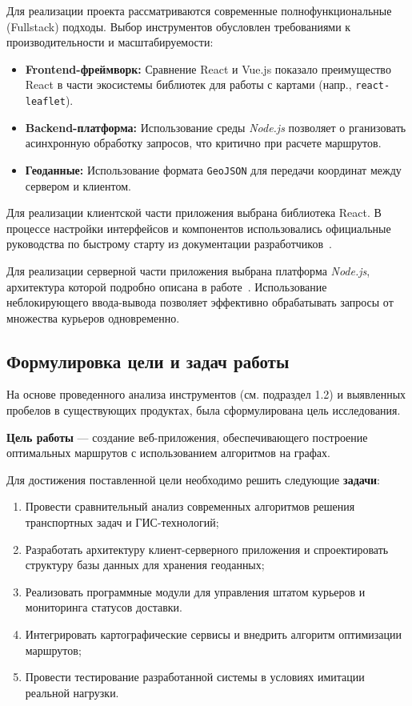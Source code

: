 Для реализации проекта рассматриваются современные полнофункциональные (Fullstack)
подходы. Выбор инструментов обусловлен требованиями к производительности и
масштабируемости:

\begin{itemize}
	\item \textbf{Frontend-фреймворк:} Сравнение React и Vue.js показало преимущество
	      React в части экосистемы библиотек для работы с картами (напр., \texttt{react-leaflet}).
	\item \textbf{Backend-платформа:} Использование среды \textit{Node.js} позволяет о
	      рганизовать асинхронную обработку запросов, что критично при расчете маршрутов.
	\item \textbf{Геоданные:} Использование формата \texttt{GeoJSON} для передачи
	      координат между сервером и клиентом.
\end{itemize}

Для реализации клиентской части приложения выбрана библиотека React. В процессе 
настройки интерфейсов и компонентов использовались официальные руководства по 
быстрому старту из документации разработчиков~\cite{react_docs}.

Для реализации серверной части приложения выбрана платформа \textit{Node.js}, 
архитектура которой подробно описана в работе~\cite{cantelon2017node}. 
Использование неблокирующего ввода-вывода позволяет эффективно 
обрабатывать запросы от множества курьеров одновременно.

\subsection{Формулировка цели и задач работы}

На основе проведенного анализа инструментов (см. подраздел 1.2) и выявленных
пробелов в существующих продуктах, была сформулирована цель исследования.

\textbf{Цель работы} --- создание веб-приложения, обеспечивающего построение
оптимальных маршрутов с использованием алгоритмов на графах.


Для достижения поставленной цели необходимо решить следующие \textbf{задачи}:
\begin{enumerate}
	\item Провести сравнительный анализ современных алгоритмов решения \linebreak транспортных задач и ГИС-технологий;
	\item Разработать архитектуру клиент-серверного приложения и спроектировать структуру базы данных для хранения геоданных;
	\item Реализовать программные модули для управления штатом курьеров и мониторинга статусов доставки.
	\item Интегрировать картографические сервисы и внедрить алгоритм оптимизации маршрутов;
	\item Провести тестирование разработанной системы в условиях имитации реальной нагрузки.
\end{enumerate}